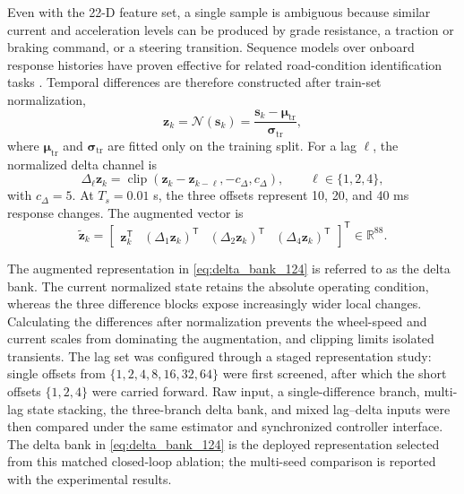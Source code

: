 \documentclass{ieeeaccess}
\newcommand{\citep}[1]{\cite{#1}}
\begin{document}
Even with the 22-D feature set, a single sample is ambiguous because similar current and acceleration levels can be produced by grade resistance, a traction or braking command, or a steering transition. Sequence models over onboard response histories have proven effective for related road-condition identification tasks \citep{Liang2022LSTMRoadID}. Temporal differences are therefore constructed after train-set normalization,
\begin{equation}
\mathbf z_k=\mathcal N(\mathbf s_k)
=\frac{\mathbf s_k-\boldsymbol\mu_{\mathrm{tr}}}
{\boldsymbol\sigma_{\mathrm{tr}}},
\label{eq:feature_train_normalization}
\end{equation}
where $\boldsymbol\mu_{\mathrm{tr}}$ and $\boldsymbol\sigma_{\mathrm{tr}}$ are fitted only on the training split. For a lag $\ell$, the normalized delta channel is
\begin{equation}
\Delta_{\ell}\mathbf z_k=
\operatorname{clip}\!\left(
\mathbf z_k-\mathbf z_{k-\ell},-c_{\Delta},c_{\Delta}
\right),\qquad \ell\in\{1,2,4\},
\label{eq:multiscale_delta_lag}
\end{equation}
with $c_{\Delta}=5$. At $T_s=0.01$ s, the three offsets represent 10, 20, and 40 ms response changes. The augmented vector is
\begin{equation}
\widetilde{\mathbf z}_k=
\begin{bmatrix}
\mathbf z_k^{\mathsf T}&
(\Delta_1\mathbf z_k)^{\mathsf T}&
(\Delta_2\mathbf z_k)^{\mathsf T}&
(\Delta_4\mathbf z_k)^{\mathsf T}
\end{bmatrix}^{\mathsf T}
\in\mathbb R^{88}.
\label{eq:delta_bank_124}
\end{equation}

The augmented representation in \eqref{eq:delta_bank_124} is referred to as the delta bank. The current normalized state retains the absolute operating condition, whereas the three difference blocks expose increasingly wider local changes. Calculating the differences after normalization prevents the wheel-speed and current scales from dominating the augmentation, and clipping limits isolated transients. The lag set was configured through a staged representation study: single offsets from $\{1,2,4,8,16,32,64\}$ were first screened, after which the short offsets $\{1,2,4\}$ were carried forward. Raw input, a single-difference branch, multi-lag state stacking, the three-branch delta bank, and mixed lag--delta inputs were then compared under the same estimator and synchronized controller interface. The delta bank in \eqref{eq:delta_bank_124} is the deployed representation selected from this matched closed-loop ablation; the multi-seed comparison is reported with the experimental results.
\end{document}
